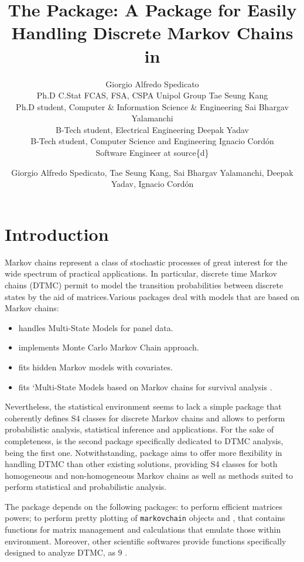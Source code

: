 \documentclass[
  nojss]{jss}
\author{
Giorgio Alfredo Spedicato\\Ph.D C.Stat FCAS, FSA, CSPA Unipol Group \And Tae Seung Kang\\Ph.D student, Computer \& Information Science \& Engineering \And Sai Bhargav Yalamanchi\\B-Tech student, Electrical Engineering \And Deepak Yadav\\B-Tech student, Computer Science and Engineering \And Ignacio Cordón\\Software Engineer at source\{d\}
}
\title{The \pkg{markovchain} Package: A Package for Easily Handling Discrete Markov Chains in \proglang{R}}
\author{\small{Giorgio Alfredo Spedicato, Tae Seung Kang, Sai Bhargav Yalamanchi, Deepak Yadav, Ignacio Cordón}}
\providecommand{\tightlist}{%
  \setlength{\itemsep}{0pt}\setlength{\parskip}{0pt}}
\begin{document}
\hypertarget{introduction}{%
\section{Introduction}\label{introduction}}

Markov chains represent a class of stochastic processes of great interest for the wide spectrum of practical applications. In particular, discrete time Markov chains (DTMC) permit to model the transition probabilities between discrete states by the aid of matrices.Various  packages deal with models that are based on Markov chains:

\begin{itemize}
\tightlist
\item
   \citep{msmR} handles Multi-State Models for panel data.
\item
   \citep{mcmcR} implements Monte Carlo Markov Chain approach.
\item
   \citep{hmmR} fits hidden Markov models with covariates.
\item
   fits `Multi-State Models based on Markov chains for survival analysis \citep{mstateR}.
\end{itemize}

Nevertheless, the  statistical environment \citep{rSoftware} seems to lack a simple package that coherently defines S4 classes for discrete Markov chains and allows to perform probabilistic analysis, statistical inference and applications. For the sake of completeness,  is the second package specifically dedicated to DTMC analysis, being  \citep{DTMCPackR} the first one. Notwithstanding,  package \citep{pkg:markovchain} aims to offer more flexibility in handling DTMC than other existing solutions, providing S4 classes for both homogeneous and non-homogeneous Markov chains as well as methods suited to perform statistical and probabilistic analysis.

The  package depends on the following  packages:  \citep{expmR} to perform efficient matrices powers;  \citep{pkg:igraph} to perform pretty plotting of \texttt{markovchain} objects and  \citep{pkg:matlab}, that contains functions for matrix management and calculations that emulate those within  environment. Moreover, other scientific softwares provide functions specifically designed to analyze DTMC, as  9 \citep{mathematica9}.
\end{document}
